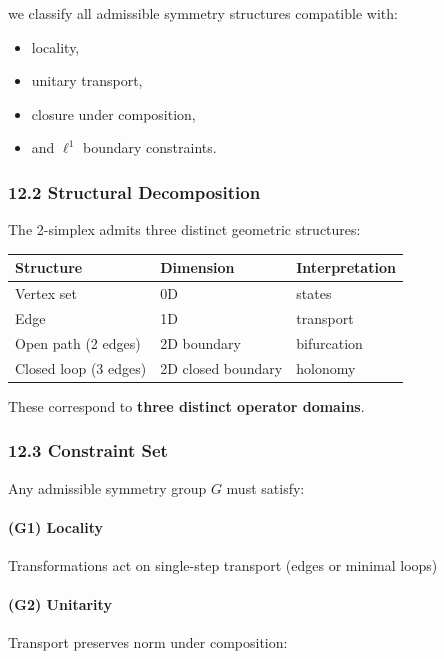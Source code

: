 \documentclass[
]{article}
\providecommand{\tightlist}{%
  \setlength{\itemsep}{0pt}\setlength{\parskip}{0pt}}
\begin{document}
we classify all admissible symmetry structures compatible with:

\begin{itemize}
\tightlist
\item
  locality,
\item
  unitary transport,
\item
  closure under composition,
\item
  and \(\ell^1\) boundary constraints.
\end{itemize}

\hypertarget{structural-decomposition}{%
\subsubsection{12.2 Structural
Decomposition}\label{structural-decomposition}}

The 2-simplex admits three distinct geometric structures:

\begin{longtable}[]{@{}lll@{}}
\toprule
Structure & Dimension & Interpretation\tabularnewline
\midrule
\endhead
Vertex set & 0D & states\tabularnewline
Edge & 1D & transport\tabularnewline
Open path (2 edges) & 2D boundary & bifurcation\tabularnewline
Closed loop (3 edges) & 2D closed boundary & holonomy\tabularnewline
\bottomrule
\end{longtable}

These correspond to \textbf{three distinct operator domains}.

\hypertarget{constraint-set}{%
\subsubsection{12.3 Constraint Set}\label{constraint-set}}

Any admissible symmetry group \(G\) must satisfy:

\hypertarget{g1-locality}{%
\paragraph{(G1) Locality}\label{g1-locality}}

Transformations act on single-step transport (edges or minimal loops)

\hypertarget{g2-unitarity}{%
\paragraph{(G2) Unitarity}\label{g2-unitarity}}

Transport preserves norm under composition:
\end{document}
